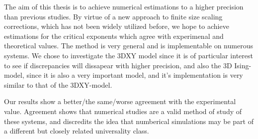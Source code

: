 The aim of this thesis is to achieve numerical estimations to a higher precision than previous studies. By virtue of a new approach to finite size scaling corrections, which has not been widely utilized before, we hope to achieve estimations for the critical exponents which agree with experimenal and theoretical values. The method is very general and is implementable on numerous systems. We chose to investigate the 3DXY model since it is of  particular interest to see if discrepancies will dissapear with higher precision, and also the 3D Ising-model, since it is also a very important model, and it's implementation is very similar to that of the 3DXY-model.

Our results show a better/the same/worse agreement with the experimental value. Agreement shows that numerical studies are a valid method of study of these systems, and discredits the idea that numberical simulations may be part of a different but closely related universality class.


